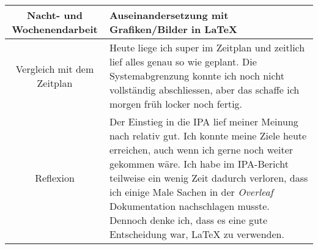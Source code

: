 \begin{tabularx}{\textwidth}[H]{|c|X|}
  Nacht- und Wochenendarbeit &
  Auseinandersetzung mit Grafiken/Bilder in LaTeX
  \\ \hline

  Vergleich mit dem Zeitplan &
  Heute liege ich super im Zeitplan und zeitlich lief alles genau so wie geplant.
  Die Systemabgrenzung konnte ich noch nicht vollständig abschliessen, aber das schaffe ich morgen früh locker noch fertig.
  \\ \hline

  Reflexion                  &
  Der Einstieg in die IPA lief meiner Meinung nach relativ gut. Ich konnte meine Ziele heute erreichen, auch wenn ich gerne
  noch weiter gekommen wäre. Ich habe im IPA-Bericht teilweise ein wenig Zeit dadurch verloren, dass
  ich einige Male Sachen in der \emph{Overleaf} Dokumentation nachschlagen musste. Dennoch denke ich, dass es eine
  gute Entscheidung war, LaTeX zu verwenden.
  \\ \hline
\end{tabularx}
